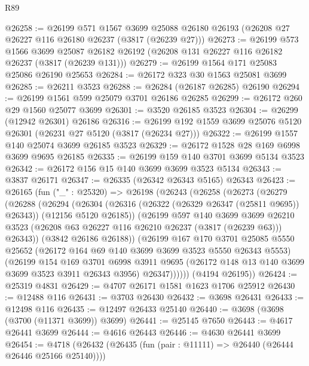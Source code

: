 \begin{lexlean}{R89}
\begin{coremodule}
@26258 := @26199
    @571
    @1567
    @3699
    @25088
    @26180
    @26193
    (@26208 @27 @26227 @116 @26180 @26237 (@3817 (@26239 @27)))
@26273 := @26199
    @573
    @1566
    @3699
    @25087
    @26182
    @26192
    (@26208 @131 @26227 @116 @26182 @26237 (@3817 (@26239 @131)))
@26279 := @26199 @1564 @171 @25083 @25086 @26190 @25653
@26284 := @26172 @323 @30 @1563 @25081 @3699
@26285 := @26211 @3523
@26288 := @26284 (@26187 @26285) @26190
@26294 := @26199 @1561 @599 @25079 @3701 @26186 @26285
@26299 := @26172 @260 @29 @1560 @25077 @3699
@26301 := @3520 @26185 @3523
@26304 := @26299 (@12942 @26301) @26186
@26316 := @26199 @192 @1559 @3699 @25076 @5120 @26301 (@26231 @27 @5120 (@3817 (@26234 @27)))
@26322 := @26199 @1557 @140 @25074 @3699 @26185 @3523
@26329 := @26172 @1528 @28 @169 @6998 @3699 @9695 @26185
@26335 := @26199 @159 @140 @3701 @3699 @5134 @3523
@26342 := @26172 @156 @15 @140 @3699 @3699 @3523 @5134
@26343 := @3837 @26171
@26347 := @26335 (@26342 @26343 @5165) @26343
@26423 := @26165
    (fun ("_" : @25320) =>
    @26198
      (@26243
        (@26258
          (@26273
            (@26279
              (@26288
                (@26294
                  (@26304
                    (@26316 (@26322 (@26329 @26347 (@25811 @9695)) @26343))
                    (@12156 @5120 @26185))
                  (@26199
                    @597
                    @140
                    @3699
                    @3699
                    @26210
                    @3523
                    (@26208 @63 @26227 @116 @26210 @26237 (@3817 (@26239 @63)))
                    @26343))
                (@3842 @26186 @26188))
              (@26199
                @167
                @170
                @3701
                @25085
                @5550
                @25652
                (@26172 @164 @69 @140 @3699 @3699 @3523 @5550 @26343 @5553)
                (@26199
                  @154
                  @169
                  @3701
                  @6998
                  @3911
                  @9695
                  (@26172 @148 @13 @140 @3699 @3699 @3523 @3911 @26343 @3956)
                  @26347))))))
      (@4194 @26195))
@26424 := @25319 @4831
@26429 := @4707 @26171 @1581 @1623 @1706 @25912
@26430 := @12488 @116
@26431 := @3703 @26430
@26432 := @3698 @26431
@26433 := @12498 @116
@26435 := @12497 @26433 @25140
@26440 := @3698 (@3698 (@3700 (@11371 @3699)) @3699)
@26441 := @25145 @7650
@26443 := @4617 @26441 @3699
@26444 := @4616 @26443
@26446 := @4630 @26441 @3699
@26454 := @4718 (@26432 (@26435 (fun (pair : @11111) => @26440 (@26444 @26446 @25166 @25140))))

\end{coremodule}
\end{lexlean}
